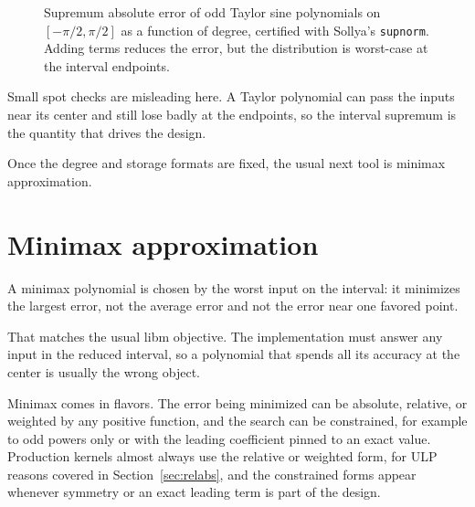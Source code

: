 \documentclass[manuscript, nonacm]{acmart}
\newcommand{\approxdata}[1]{tools/proofs/math/approx_doc/data/#1}
\begin{document}
  \begin{figure}[tbp]
    \centering
    \caption{Supremum absolute error of odd Taylor sine polynomials on
      $[-\pi/2,\pi/2]$ as a function of degree, certified with Sollya's
      \texttt{supnorm}. Adding terms reduces the error, but the distribution
      is worst-case at the interval endpoints.}
  \end{figure}

  Small spot checks are misleading here. A Taylor polynomial can pass the
  inputs near its center and still lose badly at the endpoints, so the interval
  supremum is the quantity that drives the design.

  Once the degree and storage formats are fixed, the usual next tool is minimax
  approximation.



  \section{Minimax approximation}

  A minimax polynomial is chosen by the worst input on the interval: it minimizes
  the largest error, not the average error and not the error near one favored
  point.

  That matches the usual libm objective. The implementation must answer any
  input in the reduced interval, so a polynomial that spends all its accuracy at
  the center is usually the wrong object.

  Minimax comes in flavors. The error being minimized can be absolute,
  relative, or weighted by any positive function, and the search can be
  constrained, for example to odd powers only or with the leading
  coefficient pinned to an exact value. Production kernels almost always
  use the relative or weighted form, for ULP reasons covered in
  Section~\ref{sec:relabs}, and the constrained forms appear whenever
  symmetry or an exact leading term is part of the design.
\end{document}
